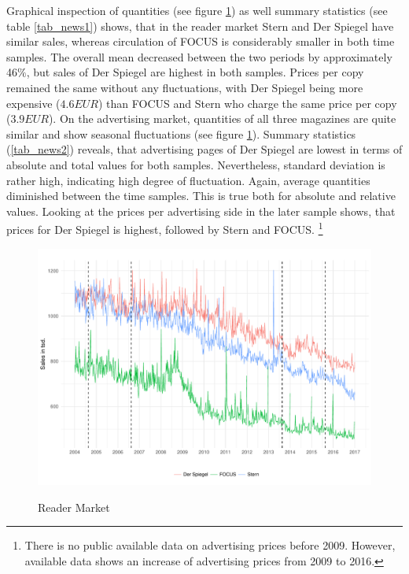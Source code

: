 \documentclass[12pt,a4paper,notitlepage]{article}
\begin{document}
Graphical inspection of quantities (see figure \ref{fig_circ_fss1}) as well summary statistics (see table \ref{tab_news1}) shows, that in the reader market Stern and Der Spiegel have similar sales, whereas circulation of FOCUS is considerably smaller in both time samples. The overall mean decreased between the two periods by approximately 46$\%$, but sales of Der Spiegel are highest in both samples. Prices per copy remained the same without any fluctuations, with Der Spiegel being more expensive ($4.6 EUR$) than FOCUS and Stern who charge the same price per copy ($3.9 EUR$). On the advertising market, quantities of all three magazines are quite similar and show seasonal fluctuations (see figure \ref{fig_circ_fss1}). Summary statistics (\ref{tab_news2}) reveals, that advertising pages of Der Spiegel are lowest in terms of absolute and total values for both samples. Nevertheless, standard deviation is rather high, indicating high degree of fluctuation. Again, average quantities diminished between the time samples. This is true both for absolute and relative values. Looking at the prices per advertising side in the later sample shows, that prices for Der Spiegel is highest, followed by Stern and FOCUS. \footnote{There is no public available data on advertising prices before 2009. However, available data shows an increase of advertising prices from 2009 to 2016.}

\begin{figure}[H]
\caption{Reader Market}
\includegraphics{figs/circ_fss}
\label{fig_circ_fss1}
\end{figure}
\end{document}
